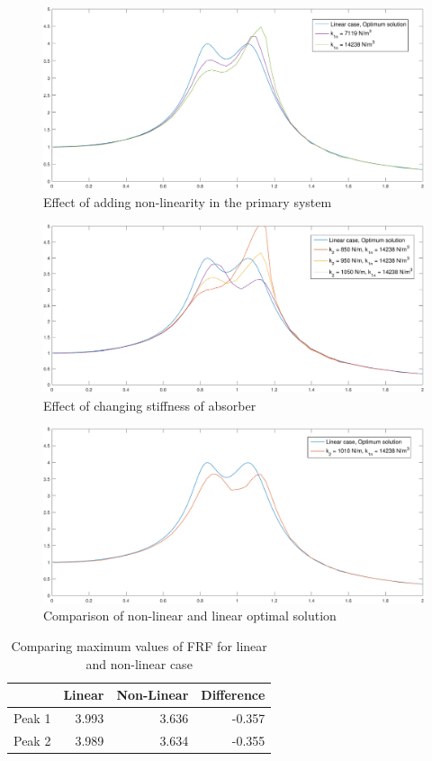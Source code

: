 \begin{figure}[h!]
\includegraphics[width=\textwidth, height = 0.5\textwidth]{"figures/addingNonlinearity"}
\caption{Effect of adding non-linearity in the primary system}
\end{figure}

\begin{figure}[h!]
\includegraphics[width=\textwidth, height = 0.5\textwidth]{"figures/changingk2"}
\caption{Effect of changing stiffness of absorber}
\end{figure}

\begin{figure}[h!]
\includegraphics[width=\textwidth, height = 0.5\textwidth]{"figures/comparing"}
\caption{Comparison of non-linear and linear optimal solution}
\end{figure}

\begin{table}[h!]
\centering
\begin{tabular}{|r|r|r|r|}
\hline
 & Linear & Non-Linear & Difference \\ \hline
Peak 1& 3.993 & 3.636 & -0.357\\
Peak 2 & 3.989  & 3.634 & -0.355\\ \hline
\end{tabular}
\caption{Comparing maximum values of FRF for linear and non-linear case}
\end{table}